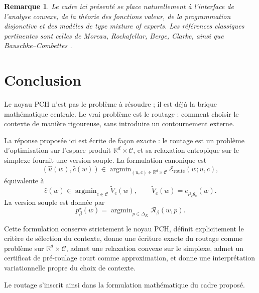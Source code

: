 \documentclass[11pt,a4paper]{article}
\newtheorem{remark}{Remarque}[section]
\DeclareMathOperator{\argmin}{argmin}
\newcommand{\R}{\mathbb R}
\newcommand{\Ccal}{\mathcal C}
\newcommand{\Rcal}{\mathcal R}
\begin{document}
\begin{remark}
Le cadre ici présenté se place naturellement à l'interface de l'analyse convexe, de la théorie des fonctions valeur, de la programmation disjonctive et des modèles de type \emph{mixture of experts}. Les références classiques pertinentes sont celles de Moreau, Rockafellar, Berge, Clarke, ainsi que Bauschke--Combettes \cite{Moreau1965,Rockafellar1970,Berge1963,Clarke1983,BauschkeCombettes2017,RockafellarWets1998}.
\end{remark}

\section{Conclusion}

Le noyau PCH n'est pas le problème à résoudre ; il est déjà la brique mathématique centrale. Le vrai problème est le routage : comment choisir le contexte de manière rigoureuse, sans introduire un contournement externe.

La réponse proposée ici est écrite de façon exacte : le routage est un problème d'optimisation sur l'espace produit \(\R^d\times\Ccal\), et sa relaxation entropique sur le simplexe fournit une version souple. La formulation canonique est
\[
(\hat u(w),\hat c(w))\in\argmin_{(u,c)\in\R^d\times\Ccal}\mathcal E_{\mathrm{route}}(w;u,c),
\]
équivalente à
\[
\hat c(w)\in\argmin_{c\in\Ccal}\widetilde V_c(w),
\qquad
\widetilde V_c(w)=e_{\mu_c g_c}(w).
\]
La version souple est donnée par
\[
p^\star_\beta(w)
=
\argmin_{p\in\Delta_K}\Rcal_\beta(w,p).
\]

Cette formulation conserve strictement le noyau PCH, définit explicitement le critère de sélection du contexte, donne une écriture exacte du routage comme problème sur \(\R^d\times\Ccal\), admet une relaxation convexe sur le simplexe, admet un certificat de pré-roulage court comme approximation, et donne une interprétation variationnelle propre du choix de contexte.

Le routage s'inscrit ainsi dans la formulation mathématique du cadre proposé.
\end{document}
